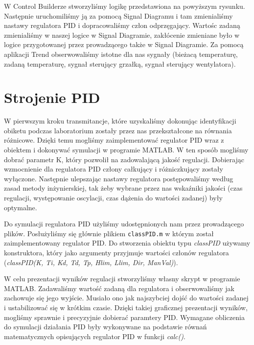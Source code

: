 \documentclass[12pt, a4paper]{article}
\begin{document}
W Control Builderze stworzyliśmy logikę przedstawiona na powyższym rysunku. Następnie uruchomiliśmy ją za pomocą Signal Diagramu i tam zmienialiśmy nastawy regulatora PID i dopracowaliśmy człon odprzęgający. Wartośc zadaną zmienialiśmy w naszej logice w Signal Diagramie, zakłócenie zmieniane było w logice przygotowanej przez prowadzącego także w Signal Diagramie. Za pomocą aplikacji Trend obserwowaliśmy istotne dla nas sygnały (bieżacą temperaturę, zadaną temperaturę, sygnał sterujący grzałką, sygnał sterujący wentylatora).

\section{Strojenie PID}
W pierwszym kroku transmitancje, które uzyskaliśmy dokonując identyfikacji obiketu podczas laboratorium zostały przez nas przekształcone na równania różnicowe. Dzięki temu mogliśmy zaimplementować regulator PID wraz z obiektem i dokonywać symulacji w programie MATLAB. W ten sposób mogliśmy dobrać parametr K, który pozwolił na zadowalającą jakość regulacji. Dobierając wzmocnienie dla regulatora PID człony całkujący i różniczkujący zostały wyłączone. Następnie ulepszając nastawy regulatora postępowaliśmy według zasad metody inżynierskiej, tak żeby wybrane przez nas wskaźniki jakości (czas regulacji, występowanie oscylacji, czas dążenia do wartości zadanej) były optymalne.

Do symulacji regulatora PID użyliśmy udostępnionych nam przez prowadzącego plików. Posłużyliśmy się głównie plikiem \verb|classPID.m| w którym został zaimplementowany regulator PID. Do stworzenia obiektu typu \textit{classPID} używamy konstruktora, który jako argumenty przyjmuje wartości członów regulatora (\textit{classPID(K, Ti, Kd, Td, Tp, Hlim, Llim, Dir, ManVal)}).
 
W celu prezentacji wyników regulacji stworzyliśmy własny skrypt w programie MATLAB. Zadawaliśmy wartość zadaną dla regulatora i obserwowaliśmy jak zachowuje się jego wyjście. Musiało ono jak najszybciej dojść do wartości zadanej i ustabilizować się w krótkim czasie. Dzięki takiej graficznej prezentacji wyników, mogliśmy sprawnie i precyzyjnie dobierać paramtery PID. Wymagane obliczenia do symulacji działania PID były wykonywane na podstawie równań matematycznych opisujących regulator PID w funkcji \textit{calc()}.
\end{document}
